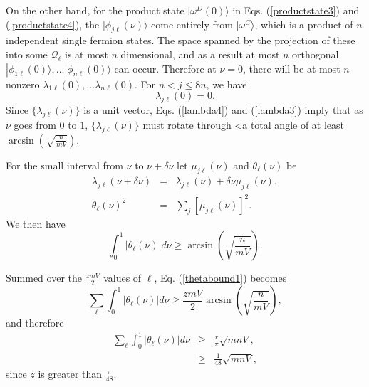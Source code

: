 \documentclass[12pt,amsmath,amssymb,onecolumn]{revtex4-2}
\begin{document}
On the other hand, for the product state $|\omega^D(0) \rangle $
in Eqs. (\ref{productstate3}) and (\ref{productstate4}),
the $|\phi_{j\ell}(\nu) \rangle $ come entirely from $|\omega^C \rangle $,
which is a product of
$n$ independent single fermion states.
The space spanned by the projection of these 
into some $\mathcal{Q}_\ell$ is at most $n$ dimensional,
and as a result at most
$n$ orthogonal $|\phi_{1\ell}(0) \rangle ,... |\phi_{n\ell}(0) \rangle $ can occur.
Therefore
at $\nu = 0$, there will be at most $n$ nonzero 
$\lambda_{1\ell}(0), ... \lambda_{n\ell}(0)$. For
$n < j \le 8n$, we have
\begin{equation}
\label{lambda3}
\lambda_{j\ell}( 0) = 0.
\end{equation}
Since $\{\lambda_{j\ell}( \nu)\}$ is a unit vector,
Eqs. (\ref{lambda4}) and (\ref{lambda3}) imply that
as $\nu$ goes from $0$ to $1$,
$\{\lambda_{j\ell}( \nu)\}$ 
must rotate through <a total angle of at least $\arcsin(\sqrt{\frac{n}{mV}})$.



For the small interval from $\nu$ to $\nu + \delta \nu$ let
$\mu_{j\ell}(\nu)$ and $\theta_{\ell}(\nu)$ be 
\begin{subequations}
\begin{eqnarray}
\label{mudeltat1}
\lambda_{j\ell}(\nu + \delta \nu) & = & \lambda_{j\ell}( \nu ) + \delta \nu \mu_{j\ell}(\nu), \\
\label{thetaoft1}
\theta_{\ell}( \nu)^2 & = & \sum_j [ \mu_{j\ell}(\nu)]^2. 
\end{eqnarray}
\end{subequations}
We then have
\begin{equation}
\label{thetabound1}
\int_0^1 | \theta_{\ell}(\nu)| d \nu \ge \arcsin(\sqrt{\frac{n}{mV}}).
\end{equation}

Summed over the $\frac{zmV}{2}$ values of $\ell$,
Eq. (\ref{thetabound1}) becomes
\begin{equation}
\label{thetaboundsum2}
\sum_{\ell} \int_0^1 | \theta_{\ell}(\nu)| d \nu  \ge 
\frac{z m V}{2} \arcsin(\sqrt{\frac{n}{mV}}),
\end{equation}
and therefore
\begin{subequations}
\begin{eqnarray}
\label{thetaboundsum3}
\sum_{\ell} \int_0^1 | \theta_{\ell}(\nu)| d \nu
&\ge& \frac{r}{\pi} \sqrt{mnV}, \\
\label{thetaboundsum4}
& \ge& \frac{1}{48} \sqrt{mnV},
\end{eqnarray}
\end{subequations}
since $z$ is greater than $\frac{\pi}{48}$.
\end{document}
